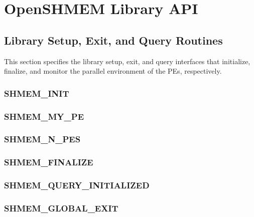 \documentclass[10pt,oneside]{book}
\begin{document}
\clearpage



\section{OpenSHMEM Library \acs{API}}\label{sec:openshmem_library_api}

\subsection{Library Setup, Exit, and Query Routines}
This section specifies the library setup, exit, and query interfaces that initialize,
finalize, and monitor the parallel environment of the \acp{PE}, respectively.

\subsubsection{\textbf{SHMEM\_INIT}}\label{subsec:shmem_init}


\subsubsection{\textbf{SHMEM\_MY\_PE}}\label{subsec:shmem_my_pe}


\subsubsection{\textbf{SHMEM\_N\_PES}}\label{subsec:shmem_n_pes}


\subsubsection{\textbf{SHMEM\_FINALIZE}}\label{subsec:shmem_finalize}


\subsubsection{\textbf{SHMEM\_QUERY\_INITIALIZED}}
\label{subsec:shmem_query_initialized}


\subsubsection{\textbf{SHMEM\_GLOBAL\_EXIT}}\label{subsec:shmem_global_exit}

\end{document}

